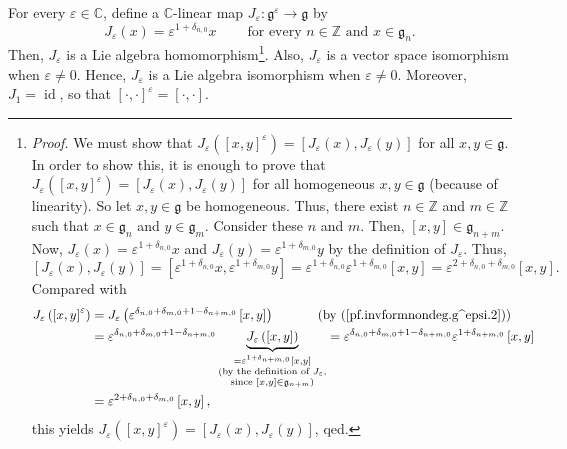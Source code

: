 \documentclass
[numbers=enddot,12pt,final,onecolumn,german,notitlepage]{scrartcl}%
\theoremstyle{definition}
\begin{document}
For every $\varepsilon\in\mathbb{C}$, define a $\mathbb{C}$-linear map
$J_{\varepsilon}:\mathfrak{g}^{\varepsilon}\rightarrow\mathfrak{g}$ by%
\[
J_{\varepsilon}\left(  x\right)  =\varepsilon^{1+\delta_{n,0}}%
x\ \ \ \ \ \ \ \ \ \ \text{for every }n\in\mathbb{Z}\text{ and }%
x\in\mathfrak{g}_{n}.
\]
Then, $J_{\varepsilon}$ is a Lie algebra homomorphism\footnote{\textit{Proof.}
We must show that $J_{\varepsilon}\left(  \left[  x,y\right]  ^{\varepsilon
}\right)  =\left[  J_{\varepsilon}\left(  x\right)  ,J_{\varepsilon}\left(
y\right)  \right]  $ for all $x,y\in\mathfrak{g}$. In order to show this, it
is enough to prove that $J_{\varepsilon}\left(  \left[  x,y\right]
^{\varepsilon}\right)  =\left[  J_{\varepsilon}\left(  x\right)
,J_{\varepsilon}\left(  y\right)  \right]  $ for all homogeneous
$x,y\in\mathfrak{g}$ (because of linearity). So let $x,y\in\mathfrak{g}$ be
homogeneous. Thus, there exist $n\in\mathbb{Z}$ and $m\in\mathbb{Z}$ such that
$x\in\mathfrak{g}_{n}$ and $y\in\mathfrak{g}_{m}$. Consider these $n$ and $m$.
Then, $\left[  x,y\right]  \in\mathfrak{g}_{n+m}$. Now, $J_{\varepsilon
}\left(  x\right)  =\varepsilon^{1+\delta_{n,0}}x$ and $J_{\varepsilon}\left(
y\right)  =\varepsilon^{1+\delta_{m,0}}y$ by the definition of $J_{\varepsilon
}$. Thus,%
\[
\left[  J_{\varepsilon}\left(  x\right)  ,J_{\varepsilon}\left(  y\right)
\right]  =\left[  \varepsilon^{1+\delta_{n,0}}x,\varepsilon^{1+\delta_{m,0}%
}y\right]  =\varepsilon^{1+\delta_{n,0}}\varepsilon^{1+\delta_{m,0}}\left[
x,y\right]  =\varepsilon^{2+\delta_{n,0}+\delta_{m,0}}\left[  x,y\right]  .
\]
Compared with%
\begin{align*}
J_{\varepsilon}\left(  \left[  x,y\right]  ^{\varepsilon}\right)   &
=J_{\varepsilon}\left(  \varepsilon^{\delta_{n,0}+\delta_{m,0}+1-\delta
_{n+m,0}}\left[  x,y\right]  \right)  \ \ \ \ \ \ \ \ \ \ \left(  \text{by
(\ref{pf.invformnondeg.g^epsi.2})}\right) \\
&  =\varepsilon^{\delta_{n,0}+\delta_{m,0}+1-\delta_{n+m,0}}%
\underbrace{J_{\varepsilon}\left(  \left[  x,y\right]  \right)  }%
_{\substack{=\varepsilon^{1+\delta_{n+m,0}}\left[  x,y\right]  \\\text{(by the
definition of }J_{\varepsilon}\text{,}\\\text{since }\left[  x,y\right]
\in\mathfrak{g}_{n+m}\text{)}}}=\varepsilon^{\delta_{n,0}+\delta
_{m,0}+1-\delta_{n+m,0}}\varepsilon^{1+\delta_{n+m,0}}\left[  x,y\right] \\
&  =\varepsilon^{2+\delta_{n,0}+\delta_{m,0}}\left[  x,y\right]  ,
\end{align*}
this yields $J_{\varepsilon}\left(  \left[  x,y\right]  ^{\varepsilon}\right)
=\left[  J_{\varepsilon}\left(  x\right)  ,J_{\varepsilon}\left(  y\right)
\right]  $, qed.}. Also, $J_{\varepsilon}$ is a vector space isomorphism when
$\varepsilon\neq0$. Hence, $J_{\varepsilon}$ is a Lie algebra isomorphism when
$\varepsilon\neq0$. Moreover, $J_{1}=\operatorname*{id}$, so that $\left[
\cdot,\cdot\right]  ^{\varepsilon}=\left[  \cdot,\cdot\right]  $.
\end{document}
